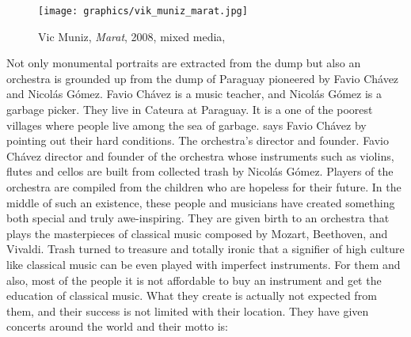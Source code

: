 \begin{figure}[h!]
  \centering
  \texttt{[image: graphics/vik\_muniz\_marat.jpg]}
  \caption{Vic Muniz, \textit{Marat}, 2008, mixed media, }
  \label{fig:VicMuniz_PicturesOfGarbage}
\end{figure}

Not only monumental portraits are extracted from the dump but also an orchestra is grounded up from the dump of Paraguay pioneered by Favio Chávez and Nicolás Gómez. Favio Chávez is a music teacher, and Nicolás Gómez is a garbage picker. They live in Cateura at Paraguay. It is a one of the poorest villages where people live among the sea of garbage.  says Favio Chávez by pointing out their hard conditions. The orchestra's director and founder. Favio Chávez director and founder of the orchestra whose instruments such as violins, flutes and cellos are built from collected trash by Nicolás Gómez. Players of the orchestra are compiled from the children who are hopeless for their future. In the middle of such an existence, these people and musicians have created something both special and truly awe-inspiring. They are given birth to an orchestra that plays the masterpieces of classical music composed by Mozart, Beethoven, and Vivaldi. Trash turned to treasure and totally ironic that a signifier of high culture like classical music can be even played with imperfect instruments. For them and also, most of the people it is not affordable to buy an instrument and get the education of classical music. What they create is actually not expected from them, and their success is not limited with their location. They have given concerts around the world and their motto is: 

